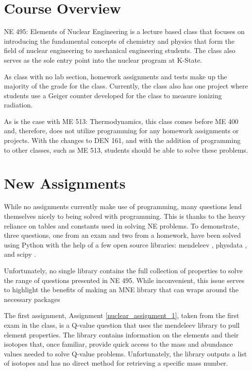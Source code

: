 \section{Course Overview}

NE 495: Elements of Nuclear Engineering is a lecture based class that focuses on introducing
the fundamental concepts of chemistry and physics that form the field of nuclear engineering 
to mechanical engineering students. The class also serves as the sole entry point into the nuclear
program at K-State. 

As class with no lab section, homework assignments and tests make up the majority of the grade
for the class. Currently, the class also has one project where students use a Geiger counter 
developed for the class to measure ionizing radiation. 

As is the case with ME 513: Thermodynamics, this class comes before ME 400 and, therefore, does
not utilize programming for any homework assignments or projects. With the changes to DEN 161,
and with the addition of programming to other classes, such as ME 513, students should be able 
to solve these problems.

\section{New Assignments}

While no assignments currently make use of programming, many questions lend themselves nicely
to being solved with programming. This is thanks to the heavy reliance on tables and
constants used in solving NE problems. To demonstrate, three questions, one from an exam
and two from a homework, have been solved using Python with the help of a few open source
libraries: mendeleev \cite{Mentel_mendeleev_-_A_2021}, physdata \cite{physdata2016}, and scipy
\cite{2020SciPy-NMeth}.

Unfortunately, no single library contains the full collection of properties to solve the range
of questions presented in NE 495. While inconvenient, this issue serves to highlight the
benefits of making an MNE library that can wraps around the necessary packages

The first assignment, Assignment \ref{nuclear_assignment_1}, taken from the first exam in the class, 
is a Q-value question that uses 
the mendeleev library to pull element properties. The library contains information on the elements
and their isotopes that, once familiar, provide quick access to the mass and abundance values
needed to solve Q-value problems. Unfortunately, the library outputs a list of isotopes and 
has no direct method for retrieving a specific mass number.

